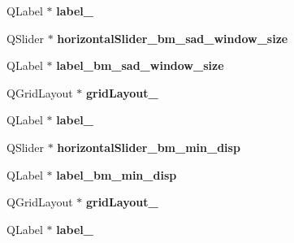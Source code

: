 \begin{DoxyCompactItemize}
\item 
\hypertarget{class_ui__stereo_match_param_form_a8f2edaf8593aa6a83f2cc2b592081260}{}Q\+Label $\ast$ {\bfseries label\+\_}\label{class_ui__stereo_match_param_form_a8f2edaf8593aa6a83f2cc2b592081260}

\item 
\hypertarget{class_ui__stereo_match_param_form_a796cb93970db2c414493dfb990dc6086}{}Q\+Slider $\ast$ {\bfseries horizontal\+Slider\+\_\+bm\+\_\+sad\+\_\+window\+\_\+size}\label{class_ui__stereo_match_param_form_a796cb93970db2c414493dfb990dc6086}

\item 
\hypertarget{class_ui__stereo_match_param_form_afed878e1cac18b7c82e9b5cf385c1802}{}Q\+Label $\ast$ {\bfseries label\+\_\+bm\+\_\+sad\+\_\+window\+\_\+size}\label{class_ui__stereo_match_param_form_afed878e1cac18b7c82e9b5cf385c1802}

\item 
\hypertarget{class_ui__stereo_match_param_form_a7a087c7b29cd298f7651e90278235164}{}Q\+Grid\+Layout $\ast$ {\bfseries grid\+Layout\+\_}\label{class_ui__stereo_match_param_form_a7a087c7b29cd298f7651e90278235164}

\item 
\hypertarget{class_ui__stereo_match_param_form_a70b7ee5a8bb2bbe63e80a57222a71595}{}Q\+Label $\ast$ {\bfseries label\+\_}\label{class_ui__stereo_match_param_form_a70b7ee5a8bb2bbe63e80a57222a71595}

\item 
\hypertarget{class_ui__stereo_match_param_form_ab6277ce55fa38ab6a7089fb1949356ff}{}Q\+Slider $\ast$ {\bfseries horizontal\+Slider\+\_\+bm\+\_\+min\+\_\+disp}\label{class_ui__stereo_match_param_form_ab6277ce55fa38ab6a7089fb1949356ff}

\item 
\hypertarget{class_ui__stereo_match_param_form_a6f61a5b917bc2507230e5c3836a65be2}{}Q\+Label $\ast$ {\bfseries label\+\_\+bm\+\_\+min\+\_\+disp}\label{class_ui__stereo_match_param_form_a6f61a5b917bc2507230e5c3836a65be2}

\item 
\hypertarget{class_ui__stereo_match_param_form_a940af64b09ed60215718d7501d700999}{}Q\+Grid\+Layout $\ast$ {\bfseries grid\+Layout\+\_}\label{class_ui__stereo_match_param_form_a940af64b09ed60215718d7501d700999}

\item 
\hypertarget{class_ui__stereo_match_param_form_af96cde3df18f7d9d9e0cef8a33e65529}{}Q\+Label $\ast$ {\bfseries label\+\_}\label{class_ui__stereo_match_param_form_af96cde3df18f7d9d9e0cef8a33e65529}


\end{DoxyCompactItemize}
